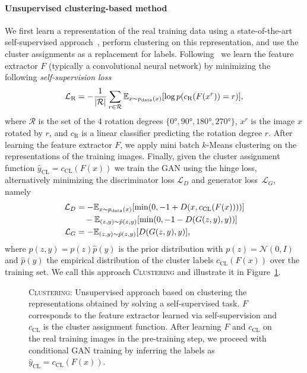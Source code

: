 \documentclass{article}
\newcommand{\pdata}{p_{\rm{data}}}
\newcommand{\E}{\mathbb{E}}
\newcommand{\Ls}{\mathcal{L}}
\newcommand{\cCL}{c_\text{CL}}
\newcommand{\yCL}{\hat y_\text{CL}}
\newcommand{\cRot}{c_\text{R}}
\newcommand{\xR}{x^r}
\newcommand{\tranC}{\textsc{Clustering}}
\begin{document}
\paragraph{Unsupervised clustering-based method}
We first learn a representation of the real training data using a state-of-the-art self-supervised approach~\citep{gidaris2018unsupervised, kolesnikov2019revisiting}, perform clustering on this representation, and use the cluster assignments as a replacement for labels. Following~\citet{gidaris2018unsupervised} we learn the feature extractor $F$ (typically a convolutional neural network) by minimizing the following \emph{self-supervision loss}
\begin{equation}
\Ls_\text{R} = -\frac{1}{|\mathcal{R}|} \sum_{r \in \mathcal{R}} \E_{x \sim \pdata(x)}[\log p(\cRot(F(x^r))=r)], \label{eq:rotlossF}
\end{equation}
where $\mathcal{R}$ is the set of the $4$ rotation degrees $\{\ang{0}, \ang{90}, \ang{180}, \ang{270}\}$, $\xR$ is the image $x$ rotated by $r$, and $\cRot$ is a linear classifier predicting the rotation degree $r$. After learning the feature extractor $F$, we apply mini batch $k$-Means clustering \citep{sculley2010web} on the representations of the training images. Finally, given the cluster assignment function $\yCL = \cCL(F(x))$ we train the GAN using the hinge loss, alternatively minimizing the discriminator loss $\Ls_D$ and generator loss~$\Ls_G$, namely
\begin{align*}
\Ls_D &= -\E_{x \sim \pdata(x)}[\min(0, -1+D(x,\cCL(F(x))))] \nonumber\\
& \quad- \E_{(z,y) \sim \hat p(z,y)}[\min(0,-1-D(G(z,y),y))]\nonumber\\
\Ls_G &= -\E_{(z,y)\sim \hat p(z,y)}[D(G(z,y),y)],
\end{align*}
where $\hat p(z,y)= p(z)\hat p(y)$ is the prior distribution with $p(z)=\mathcal{N}(0,I)$ and $\hat p(y)$ the empirical distribution of the cluster labels $\cCL(F(x))$ over the training set. 
We call this approach \tranC{} and illustrate it in Figure~\ref{fig:unsupervised_illustration}.

\begin{figure}[t]
\centering
{}
\caption{\tranC{}: Unsupervised approach based on clustering the representations obtained by solving a self-supervised task. $F$ corresponds to the feature extractor learned via self-supervision and $\cCL$ is the cluster assignment function. After learning $F$ and $\cCL$ on the real training images in the pre-training step, we proceed with conditional GAN training by inferring the labels as $\yCL = \cCL(F(x))$. \label{fig:unsupervised_illustration}}
\end{figure}
\end{document}
